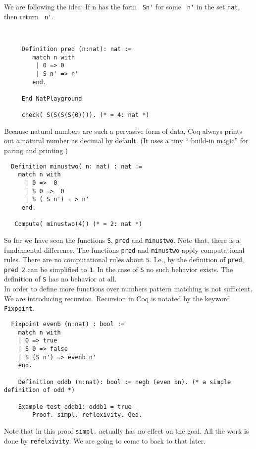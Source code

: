   We are following the idea:  If n has the form \lstinline! Sn'! for some \lstinline! n'! in the set \lstinline!nat!, then return  \lstinline! n'!.
  \begin{example}~\\\vspace{-10mm}
   \begin{lstlisting}
  	 Definition pred (n:nat): nat :=
   		match n with 
   	     | 0 => 0
   	     | S n' => n'
   	    end. 
   	  
   	 End NatPlayground
   	 
   	 check( S(S(S(S(0)))). (* = 4: nat *)
   \end{lstlisting}
  \end{example}
  Because natural numbers are such a pervasive form of data, Coq always prints out a natural number as decimal by default.
  (It uses a tiny `` build-in magic'' for paring and printing.)
 
  \begin{lstlisting}
  Definition minustwo( n: nat) : nat :=
    match n with
      | 0 =>  0
      | S 0 =>  0
      | S ( S n') = > n'
     end.
     
   Compute( minustwo(4)) (* = 2: nat *)
  \end{lstlisting}  
  So far we have seen the functions \lstinline!S!, \lstinline!pred! and \lstinline!minustwo!.
  Note that, there is a fundamental difference.
  The functions \lstinline!pred! and \lstinline!minustwo! apply computational rules. 
  There are no computational rules about \lstinline!S!.
  I.e., by the definition of \lstinline!pred!, \lstinline!pred 2! can be simplified to \lstinline!1!. 
  In the case of \lstinline!S! no such behavior exists.
  The definition of \lstinline!S! has no behavior at all.\\ 
    
  In order to define more functions over numbers pattern matching is not sufficient. We are introducing recursion.
  Recursion in Coq is notated by the keyword \lstinline!Fixpoint!.
  
  \begin{lstlisting}
  Fixpoint evenb (n:nat) : bool :=
  	match n with
  	| 0 => true
  	| S 0 => false
  	| S (S n') => evenb n'
  	end.
  	
  	Definition oddb (n:nat): bool := negb (even bn). (* a simple definition of odd *)
  	
  	Example test_oddb1: oddb1 = true
    	Proof. simpl. reflexivity. Qed.
  \end{lstlisting}
   Note that in this proof \lstinline!simpl.! actually has no effect on the goal. 
   All the work is done by \lstinline!refelxivity!. 
   We are going to come to back to that later.
   
